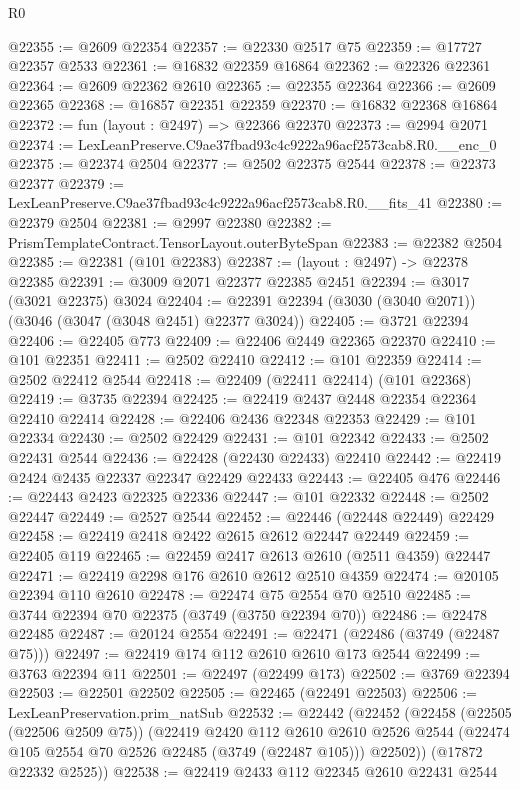 \begin{lexlean}{R0}
\begin{coremodule}
@22355 := @2609 @22354
@22357 := @22330 @2517 @75
@22359 := @17727 @22357 @2533
@22361 := @16832 @22359 @16864
@22362 := @22326 @22361
@22364 := @2609 @22362 @2610
@22365 := @22355 @22364
@22366 := @2609 @22365
@22368 := @16857 @22351 @22359
@22370 := @16832 @22368 @16864
@22372 := fun (layout : @2497) => @22366 @22370
@22373 := @2994 @2071
@22374 := LexLeanPreserve.C9ae37fbad93c4c9222a96acf2573cab8.R0.__enc_0
@22375 := @22374 @2504
@22377 := @2502 @22375 @2544
@22378 := @22373 @22377
@22379 := LexLeanPreserve.C9ae37fbad93c4c9222a96acf2573cab8.R0.__fits_41
@22380 := @22379 @2504
@22381 := @2997 @22380
@22382 := PrismTemplateContract.TensorLayout.outerByteSpan
@22383 := @22382 @2504
@22385 := @22381 (@101 @22383)
@22387 := (layout : @2497) -> @22378 @22385
@22391 := @3009 @2071 @22377 @22385 @2451
@22394 := @3017 (@3021 @22375) @3024
@22404 := @22391 @22394 (@3030 (@3040 @2071)) (@3046 (@3047 (@3048 @2451) @22377 @3024))
@22405 := @3721 @22394
@22406 := @22405 @773
@22409 := @22406 @2449 @22365 @22370
@22410 := @101 @22351
@22411 := @2502 @22410
@22412 := @101 @22359
@22414 := @2502 @22412 @2544
@22418 := @22409 (@22411 @22414) (@101 @22368)
@22419 := @3735 @22394
@22425 := @22419 @2437 @2448 @22354 @22364 @22410 @22414
@22428 := @22406 @2436 @22348 @22353
@22429 := @101 @22334
@22430 := @2502 @22429
@22431 := @101 @22342
@22433 := @2502 @22431 @2544
@22436 := @22428 (@22430 @22433) @22410
@22442 := @22419 @2424 @2435 @22337 @22347 @22429 @22433
@22443 := @22405 @476
@22446 := @22443 @2423 @22325 @22336
@22447 := @101 @22332
@22448 := @2502 @22447
@22449 := @2527 @2544
@22452 := @22446 (@22448 @22449) @22429
@22458 := @22419 @2418 @2422 @2615 @2612 @22447 @22449
@22459 := @22405 @119
@22465 := @22459 @2417 @2613 @2610 (@2511 @4359) @22447
@22471 := @22419 @2298 @176 @2610 @2612 @2510 @4359
@22474 := @20105 @22394 @110 @2610
@22478 := @22474 @75 @2554 @70 @2510
@22485 := @3744 @22394 @70 @22375 (@3749 (@3750 @22394 @70))
@22486 := @22478 @22485
@22487 := @20124 @2554
@22491 := @22471 (@22486 (@3749 (@22487 @75)))
@22497 := @22419 @174 @112 @2610 @2610 @173 @2544
@22499 := @3763 @22394 @11
@22501 := @22497 (@22499 @173)
@22502 := @3769 @22394
@22503 := @22501 @22502
@22505 := @22465 (@22491 @22503)
@22506 := LexLeanPreservation.prim_natSub
@22532 := @22442
    (@22452
      (@22458
        (@22505 (@22506 @2509 @75))
        (@22419
          @2420
          @112
          @2610
          @2610
          @2526
          @2544
          (@22474 @105 @2554 @70 @2526 @22485 (@3749 (@22487 @105)))
          @22502))
      (@17872 @22332 @2525))
@22538 := @22419 @2433 @112 @22345 @2610 @22431 @2544

\end{coremodule}
\end{lexlean}

